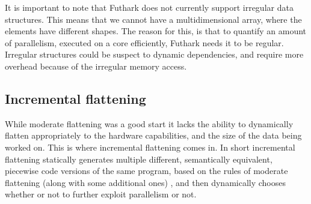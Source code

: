 It is important to note that Futhark does not currently support irregular data structures. This means that we cannot have a multidimensional array, where the elements have different shapes. The reason for this, is that to quantify an amount of parallelism, executed on a core efficiently, Futhark needs it to be regular. Irregular structures could be suspect to dynamic dependencies, and require more overhead because of the irregular memory access.  

\subsection{Incremental flattening}
While moderate flattening was a good start it lacks the ability to dynamically flatten appropriately to the hardware capabilities, and the size of the data being worked on. This is where incremental flattening comes in. In short incremental flattening statically generates multiple different, semantically equivalent, piecewise code versions of the same program, based on the rules of moderate flattening (along with some additional ones) \cite{inc-flat}, and then dynamically chooses whether or not to further exploit parallelism or not.  

